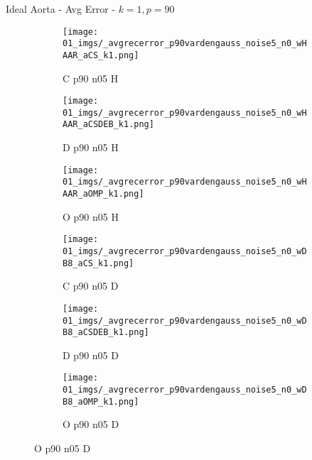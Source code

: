 \begin{frame}{Ideal Aorta - Avg Error - $k=1,p=90$}{}
\begin{figure}
\begin{subfigure}{0.13\textwidth}
\texttt{[image: 01\_imgs/\_avgrecerror\_p90vardengauss\_noise5\_n0\_wHAAR\_aCS\_k1.png]}
\caption*{\tiny C p90 n05 H}
\end{subfigure}
\begin{subfigure}{0.13\textwidth}
\texttt{[image: 01\_imgs/\_avgrecerror\_p90vardengauss\_noise5\_n0\_wHAAR\_aCSDEB\_k1.png]}
\caption*{\tiny D p90 n05 H}
\end{subfigure}
\begin{subfigure}{0.13\textwidth}
\texttt{[image: 01\_imgs/\_avgrecerror\_p90vardengauss\_noise5\_n0\_wHAAR\_aOMP\_k1.png]}
\caption*{\tiny O p90 n05 H}
\end{subfigure}
\begin{subfigure}{0.13\textwidth}
\texttt{[image: 01\_imgs/\_avgrecerror\_p90vardengauss\_noise5\_n0\_wDB8\_aCS\_k1.png]}
\caption*{\tiny C p90 n05 D}
\end{subfigure}
\begin{subfigure}{0.13\textwidth}
\texttt{[image: 01\_imgs/\_avgrecerror\_p90vardengauss\_noise5\_n0\_wDB8\_aCSDEB\_k1.png]}
\caption*{\tiny D p90 n05 D}
\end{subfigure}
\begin{subfigure}{0.13\textwidth}
\texttt{[image: 01\_imgs/\_avgrecerror\_p90vardengauss\_noise5\_n0\_wDB8\_aOMP\_k1.png]}
\caption*{\tiny O p90 n05 D}
\end{subfigure}

\vspace{5pt}


\end{figure}
\end{frame}
